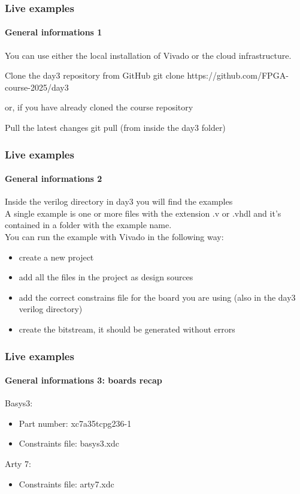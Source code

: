 \documentclass{beamer}
\begin{document}
\begin{frame}\frametitle{Live examples}
\framesubtitle{General informations 1}
You can use either the local installation of Vivado or the cloud infrastructure. \\
\vspace{0.5cm}
\begin{alertblock}{Clone the day3 repository from GitHub}
git clone https://github.com/FPGA-course-2025/day3
\end{alertblock}
or, if you have already cloned the course repository
\begin{alertblock}{Pull the latest changes}
git pull (from inside the day3 folder)
\end{alertblock}
\end{frame}

\begin{frame}\frametitle{Live examples}
\framesubtitle{General informations 2}
Inside the verilog directory in day3 you will find the examples \\
\vspace{0.7cm}
A single example is one or more files with the extension .v or .vhdl
and it's contained in a folder with the example name. \\
\vspace{0.7cm}
You can run the example with Vivado in the following way:
\begin{itemize}
	\item create a new project
	\item add all the files in the project as design sources
	\item add the correct constrains file for the board you are using (also in the day3 verilog directory)
	\item create the bitstream, it should be generated without errors
\end{itemize}
\end{frame}

\begin{frame}\frametitle{Live examples}
\framesubtitle{General informations 3: boards recap}
Basys3:
\begin{itemize}
	\item Part number: xc7a35tcpg236-1
	\item Constraints file: basys3.xdc
\end{itemize}
\vspace{1cm}
Arty 7:
\begin{itemize}
	\item Constraints file: arty7.xdc
\end{itemize}
\end{frame}
\end{document}
